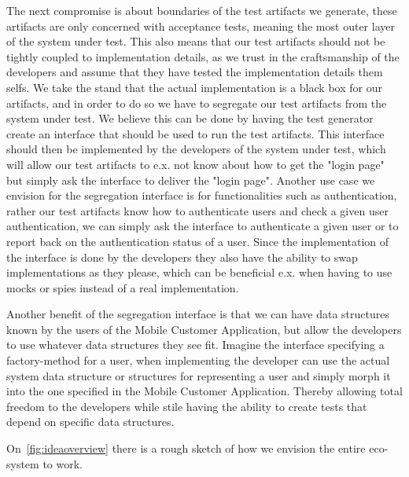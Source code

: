 The next compromise is about boundaries of the test artifacts we generate, these artifacts are only concerned with acceptance tests, meaning the most outer layer of the system under test. 
This also means that our test artifacts should not be tightly coupled to implementation details, as we trust in the craftsmanship of the developers and assume that they have tested the implementation details them selfs.
We take the stand that the actual implementation is a black box for our artifacts, and in order to do so we have to segregate our test artifacts from the system under test.
We believe this can be done by having the test generator create an interface that should be used to run the test artifacts.
This interface should then be implemented by the developers of the system under test, which will allow our test artifacts to e.x. not know about how to get the "login page" but simply ask the interface to deliver the "login page".
Another use case we envision for the segregation interface is for functionalities such as authentication, rather our test artifacts know how to authenticate users and check a given user authentication, we can simply ask the interface to authenticate a given user or to report back on the authentication status of a user.
Since the implementation of the interface is done by the developers they also have the ability to swap implementations as they please, which can be beneficial e.x. when having to use mocks or spies instead of a real implementation.

Another benefit of the segregation interface is that we can have data structures known by the users of the Mobile Customer Application, but allow the developers to use whatever data structures they see fit. Imagine the interface specifying a factory-method for a user, when implementing the developer can use the actual system data structure or structures for representing a user and simply morph it into the one specified in the Mobile Customer Application. Thereby allowing total freedom to the developers while stile having the ability to create tests that depend on specific data structures.

On~\autoref{fig:ideaoverview} there is a rough sketch of how we envision the entire eco-system to work.

